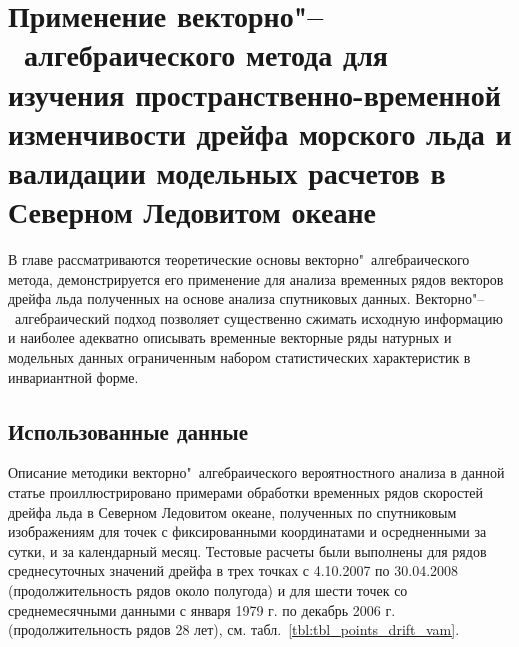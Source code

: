 \chapter{Применение векторно"--~алгебраического метода для изучения пространственно-временной изменчивости дрейфа морского льда и валидации модельных расчетов в Северном Ледовитом океане} \label{chapt3}

В главе рассматриваются теоретические основы векторно"~алгебраического метода, демонстрируется его применение для анализа временных рядов векторов дрейфа льда полученных на основе анализа спутниковых данных. Векторно"--~алгебраический подход позволяет существенно сжимать исходную информацию и наиболее адекватно описывать временные векторные ряды натурных и модельных данных ограниченным набором статистических характеристик в инвариантной форме.

\section{Использованные данные} \label{sect3_1}

Описание методики векторно"~алгебраического вероятностного анализа в данной статье проиллюстрировано примерами обработки временных рядов скоростей дрейфа льда в Северном Ледовитом океане, полученных по спутниковым изображениям для точек с фиксированными координатами и осредненными за сутки, и за календарный месяц. Тестовые расчеты были выполнены для рядов среднесуточных значений дрейфа в трех точках с 4.10.2007 по 30.04.2008 (продолжительность рядов около полугода) и для шести точек со среднемесячными данными с января 1979 г. по декабрь 2006 г. (продолжительность рядов 28 лет), см. табл.~\ref{tbl:tbl_points_drift_vam}.

